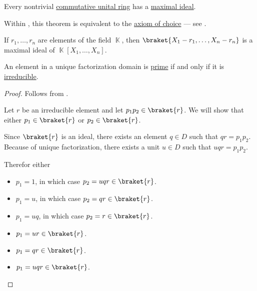 \begin{theorem}\label{thm:krulls_theorem}
  Every nontrivial \hyperref[def:ring/commutative]{commutative unital ring} has a \hyperref[def:maximal_ring_ideal]{maximal ideal}.

  Within \hyperref[def:zfc]{}, this theorem is equivalent to the \hyperref[def:zfc/choice]{axiom of choice} --- see .
\end{theorem}

\begin{proposition}\label{thm:field_maximal_ideal_representation}
  If \( r_1, \ldots, r_n \) are elements of the field \( \BbbK \), then \( \braket{X_1 - r_1, \ldots, X_n - r_n} \) is a maximal ideal of \( \BbbK[X_1, \ldots, X_n] \).
\end{proposition}

\begin{proposition}\label{thm:ufd_prime_iff_irreducible}
  An element in a unique factorization domain is \hyperref[def:prime_ring_ideal]{prime} if and only if it is \hyperref[def:irreducible_ring_element]{irreducible}.
\end{proposition}
\begin{proof}
  \SufficiencySubProof Follows from .

  \NecessitySubProof Let \( r \) be an irreducible element and let \( p_1 p_2 \in \braket{r} \). We will show that either  \( p_1 \in \braket{r} \) or \( p_2 \in \braket{r} \).

  Since \( \braket{r} \) is an ideal, there exists an element \( q \in D \) such that \( qr = p_1 p_2 \). Because of unique factorization, there exists a unit \( u \in D \) such that \( uqr = p_1 p_2  \).

  Therefor either
  \begin{itemize}
    \item \( p_1 = 1 \), in which case \( p_2 = uqr \in \braket{r} \).
    \item \( p_1 = u \), in which case \( p_2 = qr \in \braket{r} \).
    \item \( p_1 = uq \), in which case \( p_2 = r \in \braket{r} \).
    \item \( p_1 = ur \in \braket{r} \).
    \item \( p_1 = qr \in \braket{r} \).
    \item \( p_1 = uqr \in \braket{r} \).
  \end{itemize}
\end{proof}

